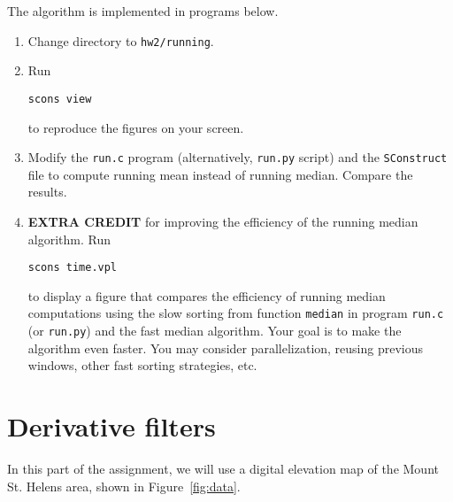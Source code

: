 
The algorithm is implemented in programs below.

\lstset{language=c,numbers=left,numberstyle=\tiny,showstringspaces=false}


\lstset{language=python,numbers=left,numberstyle=\tiny,showstringspaces=false}


\begin{enumerate}
\item Change directory to \texttt{hw2/running}.
\item Run 
\begin{verbatim}
scons view
\end{verbatim}
to reproduce the figures on your screen.
\item Modify the \texttt{run.c} program (alternatively, \texttt{run.py} script) and the
  \texttt{SConstruct} file to compute running mean instead of running
  median. Compare the results.
\item \textbf{EXTRA CREDIT} for improving the efficiency of the
  running median algorithm. Run
\begin{verbatim}
scons time.vpl
\end{verbatim}
  to display a figure that compares the efficiency of running median
  computations using the slow sorting from function \texttt{median} in
  program \texttt{run.c} (or \texttt{run.py}) and the fast median
  algorithm. Your goal is to make the algorithm even faster. You may
  consider parallelization, reusing previous windows, other fast
  sorting strategies, etc.
\end{enumerate}

\lstset{language=python,numbers=left,numberstyle=\tiny,showstringspaces=false}


\section{Derivative filters}

In this part of the assignment, we will use a digital elevation map
of the Mount St. Helens area, shown in
Figure~\ref{fig:data}.


